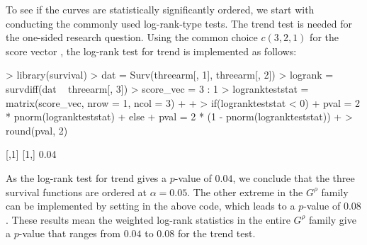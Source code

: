 To see if the curves are statistically significantly ordered, we start with conducting the commonly used log-rank-type tests. The trend test is needed for the one-sided research question. Using the common choice $c(3, 2, 1)$ for the score vector \citep[see, e.g.,][page 388]{Anderson:1993}, the log-rank test for trend is implemented as follows: \\
\begin{example}
>   library(survival)
>   dat = Surv(threearm[, 1], threearm[, 2])
>   logrank = survdiff(dat ~ threearm[, 3])
>   score_vec = 3 : 1
>   logrankteststat = matrix(score_vec, nrow = 1, ncol = 3) 
+   %
+   %
>   if(logrankteststat < 0){ 
+     pval = 2 * pnorm(logrankteststat)
+   }else{
+     pval = 2 * (1 - pnorm(logrankteststat))
+   }
>   round(pval, 2)

     [,1]
[1,] 0.04
\end{example}
As the log-rank test for trend gives a $p$-value of $0.04$, we conclude that the three survival functions are ordered at $\alpha=0.05$. 
The other extreme in the $G^\rho$ family can be implemented by setting  in the above code, which leads to a $p$-value of $0.08$. These results mean the weighted log-rank statistics in the entire $G^\rho$ family give a $p$-value that ranges from $0.04$ to $0.08$ for the trend test.

